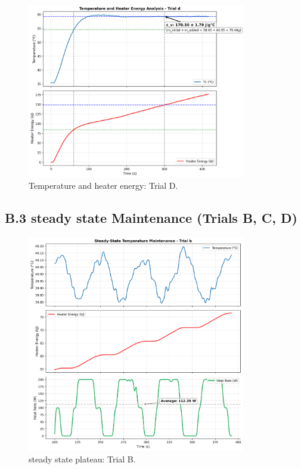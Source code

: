\documentclass[12pt]{article}
\begin{document}
\begin{figure}[H]
\centering
\includegraphics[width=0.85\textwidth]{graphs/part2_trial_d_temp_heater_energy.png}
\caption{Temperature and heater energy: Trial D.}
\end{figure}


\subsection*{B.3 steady state Maintenance (Trials B, C, D)}

\begin{figure}[H]
\centering
\includegraphics[width=0.85\textwidth]{graphs/part2_trial_b_heater_maintenance.png}
\caption{steady state plateau: Trial B.}
\end{figure}
\end{document}
